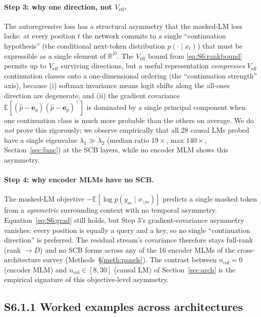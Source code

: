 \documentclass[11pt,a4paper]{article}
\begin{document}
\paragraph{Step 3: why one direction, not $V_\mathrm{eff}$.}
The autoregressive loss has a structural asymmetry that the
masked-LM loss lacks: at every position $t$ the network commits to a
single ``continuation hypothesis'' (the conditional next-token
distribution $p(\cdot\mid x_t)$) that must be expressible as a single
element of $\mathbb{R}^D$.  The $V_\mathrm{eff}$ bound from
\eqref{eq:S6:rankbound} permits up to $V_\mathrm{eff}$ surviving
directions, but a useful representation \emph{compresses}
$V_\mathrm{eff}$ continuation classes onto a one-dimensional ordering
(the ``continuation strength'' axis), because (i) softmax invariance
means logit shifts along the all-ones direction are degenerate, and
(ii) the gradient covariance
$\mathbb{E}[(\hat{p}-\mathbf{e}_y)(\hat{p}-\mathbf{e}_y)^\top]$
is dominated by a single principal component when one continuation
class is much more probable than the others on average.  We do
\emph{not} prove this rigorously; we observe empirically that
all 28 causal LMs probed have a single eigenvalue
$\lambda_1 \gg \lambda_2$ (median ratio $19\times$, max
$140\times$, Section~\ref{sec:func}) at the SCB layers, while no
encoder MLM shows this asymmetry.

\paragraph{Step 4: why encoder MLMs have no SCB.}
The masked-LM objective $-\mathbb{E}[\log p(y_m \mid x_{\setminus m})]$
predicts a single masked token from a \emph{symmetric} surrounding
context with no temporal asymmetry.  Equation~\eqref{eq:S6:grad} still
holds, but Step 3's gradient-covariance asymmetry vanishes: every
position is equally a query and a key, so no single
``continuation direction'' is preferred.  The residual stream's
covariance therefore stays full-rank (rank $\to D$) and no SCB forms
across any of the 16 encoder MLMs of the cross-architecture survey
(Methods~\S\ref{meth:panels}).  The contrast between
$n_\mathrm{col}\!=\!0$ (encoder MLM) and $n_\mathrm{col}\!\in\![8,30]$
(causal LM) of Section~\ref{sec:arch} is the empirical signature of
this objective-level asymmetry.

\subsection{S6.1.1 Worked examples across architectures}
\end{document}
